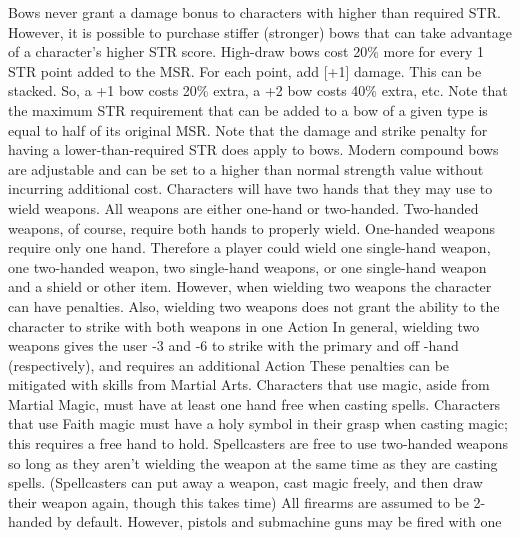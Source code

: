 \documentclass[twoside]{book}
\begin{document}
   Bows never grant a damage bonus to characters with
               higher than required STR. However, it is possible to
               purchase stiffer (stronger) bows that can take advantage
               of a character's higher STR score. High-draw bows
               cost 20\% more for every 1 STR point added to the MSR. For
               each point, add [+1] damage. This can be stacked. So, a +1
               bow costs 20\% extra, a +2 bow costs 40\% extra, etc. Note
               that the maximum STR requirement that can be added to a
               bow of a given type is equal to half of its original MSR.
               Note that the damage and strike penalty for having a
               lower-than-required STR does apply to bows. Modern
               compound bows are adjustable and can be set to a higher
               than normal strength value without incurring additional
               cost.  Characters will have two hands that they may use to
               wield weapons. All weapons are either one-hand or
               two-handed. Two-handed weapons, of course, require both
               hands to properly wield. One-handed weapons require only
               one hand. Therefore a player could wield one single-hand
               weapon, one two-handed weapon, two single-hand weapons, or
               one single-hand weapon and a shield or other item.
               However, when wielding two weapons the character can have
               penalties. Also, wielding two weapons does not grant the
               ability to the character to strike with both weapons in
               one Action In general, wielding two weapons gives the user
               -3 and -6 to strike with the primary and off -hand
               (respectively), and requires an additional Action These
               penalties can be mitigated with skills from Martial Arts.
                Characters that use magic, aside from Martial Magic,
               must have at least one hand free when casting spells.
               Characters that use Faith magic must have a holy symbol in
               their grasp when casting magic; this requires a free hand
               to hold. Spellcasters are free to use two-handed weapons
               so long as they aren't wielding the weapon at the
               same time as they are casting spells. (Spellcasters can
               put away a weapon, cast magic freely, and then draw their
               weapon again, though this takes time)  All firearms are assumed to be 2-handed by default.
               However, pistols and submachine guns may be fired with one
\end{document}
